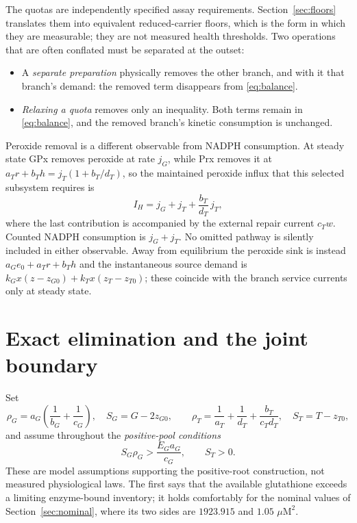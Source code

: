 \documentclass[11pt,a4paper]{article}
\theoremstyle{plain}
\theoremstyle{definition}
\theoremstyle{remark}
\newcommand{\uM}{\ensuremath{\mu\mathrm{M}}}
\begin{document}
The quotas are independently specified assay requirements. Section~\ref{sec:floors}
translates them into equivalent reduced-carrier floors, which is the form in which
they are measurable; they are not measured health thresholds. Two operations that
are often conflated must be separated at the outset:

\begin{itemize}
\item A \emph{separate preparation} physically removes the other branch, and with
  it that branch's demand: the removed term disappears from \eqref{eq:balance}.
\item \emph{Relaxing a quota} removes only an inequality. Both terms remain in
  \eqref{eq:balance}, and the removed branch's kinetic consumption is unchanged.
\end{itemize}

Peroxide removal is a different observable from NADPH consumption. At steady state
GPx removes peroxide at rate $j_G$, while Prx removes it at
$a_Tr+b_Th=j_T(1+b_T/d_T)$, so the maintained peroxide influx that this selected
subsystem requires is
\begin{equation}\label{eq:peroxide}
  I_H=j_G+j_T+\frac{b_T}{d_T}\,j_T ,
\end{equation}
where the last contribution is accompanied by the external repair current $c_Tw$.
Counted NADPH consumption is $j_G+j_T$. No omitted pathway is silently included in
either observable. Away from equilibrium the peroxide sink is instead
$a_Ge_0+a_Tr+b_Th$ and the instantaneous source demand is
$k_Gx(z-z_{G0})+k_Tx(z_T-z_{T0})$; these coincide with the branch service currents
only at steady state.

\section{Exact elimination and the joint boundary}\label{sec:boundary}

Set
\begin{equation}\label{eq:rhos}
  \rho_G=a_G\!\left(\frac1{b_G}+\frac1{c_G}\right),\quad S_G=G-2z_{G0},
  \qquad
  \rho_T=\frac1{a_T}+\frac1{d_T}+\frac{b_T}{c_Td_T},\quad S_T=T-z_{T0},
\end{equation}
and assume throughout the \emph{positive-pool conditions}
\begin{equation}\label{eq:poolcond}
  S_G\rho_G>\frac{E_Ga_G}{c_G},\qquad S_T>0 .
\end{equation}
These are model assumptions supporting the positive-root construction, not
measured physiological laws. The first says that the available glutathione
exceeds a limiting enzyme-bound inventory; it holds comfortably for the nominal
values of Section~\ref{sec:nominal}, where its two sides are $1923.915$ and
$1.05$ $\uM^2$.
\end{document}
